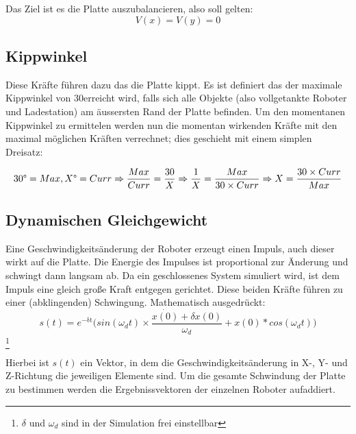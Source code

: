 Das Ziel ist es die Platte auszubalancieren, also soll gelten:
\begin{equation}\label{eq:gleichgewicht}
	V(x) = V(y) = 0
\end{equation}

\subsection{Kippwinkel}
Diese Kr{\"{a}}fte f{\"{u}}hren dazu das die Platte kippt. Es ist definiert das der maximale Kippwinkel von 30\textdegree erreicht wird, falls sich alle
Objekte (also vollgetankte Roboter und Ladestation) am {\"{a}}ussersten Rand der Platte befinden. Um den momentanen Kippwinkel zu ermittelen werden nun
die momentan wirkenden Kr{\"{a}}fte mit den maximal m{\"{o}}glichen Kr{\"{a}}ften verrechnet; dies geschieht mit einem simplen Dreisatz:

\begin{equation}\label{eq:tilt-from-maxtilt}
30\degree = Max, X\degree = Curr \\
\Rightarrow \frac{Max}{Curr} = \frac{30}{X} \\
\Rightarrow \frac{1}{X} = \frac{Max}{30 \times Curr} \\
\Rightarrow X = \frac{30 \times Curr}{Max}
\end{equation}

\subsection{Dynamischen Gleichgewicht}
Eine Geschwindigkeits{\"{a}}nderung der Roboter erzeugt einen Impuls, auch dieser wirkt auf die Platte. Die Energie des Impulses ist proportional zur
{\"{A}}nderung und schwingt dann langsam ab. Da ein geschlossenes System simuliert wird, ist dem Impuls eine gleich gro{\ss}e Kraft entgegen gerichtet.
Diese beiden Kr{\"{a}}fte f{\"{u}}hren zu einer (abklingenden) Schwingung. Mathematisch ausgedr{\"{u}}ckt:
\begin{equation}\label{eq:schwingung}
	s(t) = e^\mathrm{-\delta t} \big(sin(\omega_d t) \times \frac{\dot{x(0)} + \delta x(0)}{\omega_d} + x(0) * cos(\omega_d t)\big)
\end{equation}
\footnote{$\delta$ und $\omega_d$ sind in der Simulation frei einstellbar}

Hierbei ist $s(t)$ ein Vektor, in dem die Geschwindigkeits{\"{a}}nderung in X-, Y- und Z-Richtung die jeweiligen Elemente sind. Um die gesamte Schwindung der
Platte zu bestimmen werden die Ergebnissvektoren der einzelnen Roboter aufaddiert.


